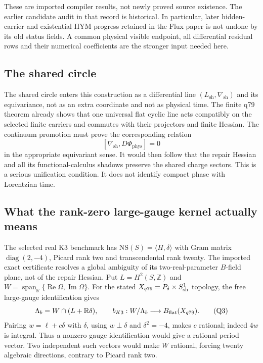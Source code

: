 \documentclass[11pt,a4paper]{article}
\begin{document}
These are imported compiler results, not newly proved source existence.
The earlier candidate audit in that record is historical. In particular,
later hidden-carrier and existential HYM progress retained in the Flux
paper is not undone by its old status fields. A common physical visible
endpoint, all differential residual rows and their numerical coefficients
are the stronger input needed here.

\subsection{The shared circle}

The shared circle enters this construction as a differential line
\((L_{\mathrm{sh}},\nabla_{\mathrm{sh}})\) and its equivariance, not as an
extra coordinate and not as physical time.  The finite q79 theorem already
shows that one universal flat cyclic line acts compatibly on the selected
finite carriers and commutes with their projectors and finite Hessian.  The
continuum promotion must prove the corresponding relation
\[
[\nabla_{\mathrm{sh}},D\Phi_{\mathrm{phys}}]=0
\]
in the appropriate equivariant sense.  It would then follow that the
repair Hessian and all its functional-calculus shadows preserve the shared
charge sectors.  This is a serious unification condition.  It does not
identify compact phase with Lorentzian time.

\subsection{What the rank-zero large-gauge kernel actually means}
\label{sec:q79-bk3-kernel}

The selected real K3 benchmark has
\(\mathrm{NS}(S)=\langle H,\delta\rangle\) with Gram matrix
\(\operatorname{diag}(2,-4)\), Picard rank two and transcendental rank twenty.
The imported exact certificate \cite{Q79BK3Kernel2026} resolves a global
ambiguity of its two-real-parameter \(B\)-field plane, not of the repair
Hessian. Put \(L=H^2(S,\mathbb Z)\) and
\(W=\operatorname{span}_{\mathbb R}\{\operatorname{Re}\Omega,
\operatorname{Im}\Omega\}\). For the stated
\(X_{q79}=P_\delta\times S^1_{\rm sh}\) topology, the free large-gauge
identification gives
\begin{equation}
 \Lambda_b=W\cap(L+\mathbb R\delta),\qquad
 b_{K3}:W/\Lambda_b\longrightarrow B_{\rm flat}(X_{q79}).
 \tag{Q3}\label{eq:q79-bk3-kernel}
\end{equation}
Pairing \(w=\ell+c\delta\) with \(\delta\), using
\(w\perp\delta\) and \(\delta^2=-4\), makes \(c\) rational;
indeed \(4w\) is integral. Thus a nonzero gauge identification would give a
rational period vector. Two independent such vectors would make \(W\)
rational, forcing twenty algebraic directions, contrary to Picard rank two.
\end{document}
